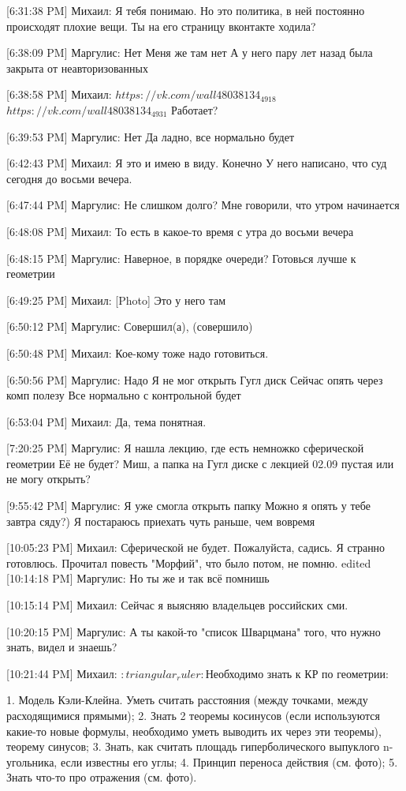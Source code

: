 \documentclass{article}
\begin{document}
[6:31:38 PM] Михаил:
Я тебя понимаю. Но это политика, в ней постоянно происходят плохие вещи.
 Ты на его страницу вконтакте ходила?

[6:38:09 PM] Маргулис:
Нет
 Меня же там нет
 А у него пару лет назад была закрыта от неавторизованных

[6:38:58 PM] Михаил:
$https://vk.com/wall48038134_4918$
$ https://vk.com/wall48038134_4931$
 Работает?

[6:39:53 PM] Маргулис:
Нет
 Да ладно, все нормально будет

[6:42:43 PM] Михаил:
Я это и имею в виду.
 Конечно
 У него написано, что суд сегодня до восьми вечера.

[6:47:44 PM] Маргулис:
Не слишком долго?
 Мне говорили, что утром начинается

[6:48:08 PM] Михаил:
То есть в какое-то время с утра до восьми вечера

[6:48:15 PM] Маргулис:
Наверное, в порядке очереди?
 Готовься лучше к геометрии

[6:49:25 PM] Михаил:
[Photo]
 Это у него там

[6:50:12 PM] Маргулис:
Совершил(а), (совершило)

[6:50:48 PM] Михаил:
Кое-кому тоже надо готовиться.

[6:50:56 PM] Маргулис:
Надо
 Я не мог открыть Гугл диск
 Сейчас опять через комп полезу
 Все нормально с контрольной будет

[6:53:04 PM] Михаил:
Да, тема понятная.

[7:20:25 PM] Маргулис:
Я нашла лекцию, где есть немножко сферической геометрии
 Её не будет?
 Миш, а папка на Гугл диске с лекцией 02.09 пустая или не могу открыть?

[9:55:42 PM] Маргулис:
Я уже смогла открыть папку
 Можно я опять у тебе завтра сяду?)
 Я постараюсь приехать чуть раньше, чем вовремя

[10:05:23 PM] Михаил:
Сферической не будет. Пожалуйста, садись. Я странно готовлюсь. Прочитал повесть "Морфий", что было потом, не помню.
edited 
[10:14:18 PM] Маргулис:
Но ты же и так всё помнишь

[10:15:14 PM] Михаил:
Сейчас я выясняю владельцев российских сми.

[10:20:15 PM] Маргулис:
А ты какой-то "список Шварцмана" того, что нужно знать, видел и знаешь?

[10:21:44 PM] Михаил:
$:triangular_ruler:$Необходимо знать к КР по геометрии:

1. Модель Кэли-Клейна. Уметь считать расстояния (между точками, между расходящимися прямыми);
2. Знать 2 теоремы косинусов (если используются какие-то новые формулы, необходимо уметь выводить их через эти теоремы), теорему синусов;
3. Знать, как считать площадь гиперболического выпуклого n-угольника, если известны его углы;
4. Принцип переноса действия (см. фото);
5. Знать что-то про отражения (см. фото).
\end{document}
